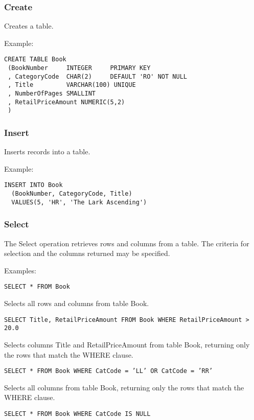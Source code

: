 

\subsubsection{Create}

Creates a table.

Example:

\begin{verbatim}
CREATE TABLE Book
 (BookNumber     INTEGER     PRIMARY KEY
 , CategoryCode  CHAR(2)     DEFAULT 'RO' NOT NULL
 , Title         VARCHAR(100) UNIQUE
 , NumberOfPages SMALLINT
 , RetailPriceAmount NUMERIC(5,2)
 )
\end{verbatim}

\subsubsection{Insert}

Inserts records into a table.

Example:

\begin{verbatim}
INSERT INTO Book
  (BookNumber, CategoryCode, Title)
  VALUES(5, 'HR', 'The Lark Ascending')
\end{verbatim}

\subsubsection{Select}

The Select operation retrieves rows and columns from a table. The criteria
for selection and the columns returned may be specified.

Examples:

\tt{SELECT * FROM Book}

Selects all rows and columns from table Book.

\tt{SELECT Title, RetailPriceAmount FROM Book WHERE RetailPriceAmount > 20.0}

Selects columns Title and RetailPriceAmount from table Book, returning only
the rows that match the WHERE clause.

\tt{SELECT * FROM Book WHERE CatCode = 'LL' OR CatCode = 'RR'}

Selects all columns from table Book, returning only
the rows that match the WHERE clause.

\tt{SELECT * FROM Book WHERE CatCode IS NULL}

